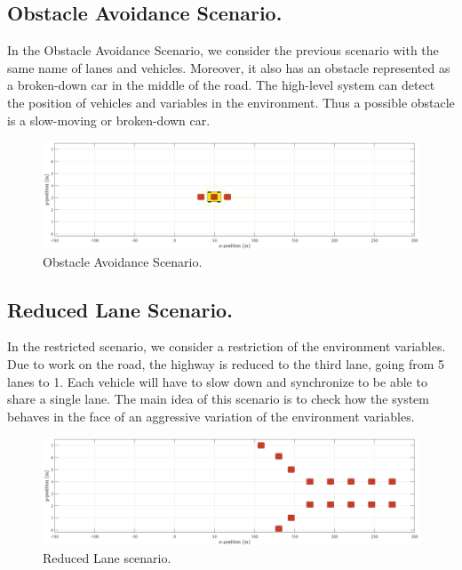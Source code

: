 \subsection{ Obstacle Avoidance Scenario.}


In the Obstacle Avoidance Scenario, we consider the previous scenario with the same name of lanes and vehicles. Moreover, it also has an obstacle represented as a broken-down car in the middle of the road. The high-level system can detect the position of vehicles and variables in the environment. Thus a possible obstacle is a slow-moving or broken-down car.

\begin{figure}[H]
\centering
    \includegraphics[width=\textwidth]{Kap5/obs_avoid_scenario.eps}
    \caption{Obstacle Avoidance Scenario.}

\end{figure}


\subsection{ Reduced Lane Scenario.}


In the restricted scenario, we consider a restriction of the environment variables. Due to work on the road, the highway is reduced to the third lane, going from 5 lanes to 1. Each vehicle will have to slow down and synchronize to be able to share a single lane. The main idea of this scenario is to check how the system behaves in the face of an aggressive variation of the environment variables.

\begin{figure}[H]
\centering
    \includegraphics[width=\textwidth]{Kap5/red_lane_scenario.eps}
    \caption{Reduced Lane scenario.}
\end{figure}


